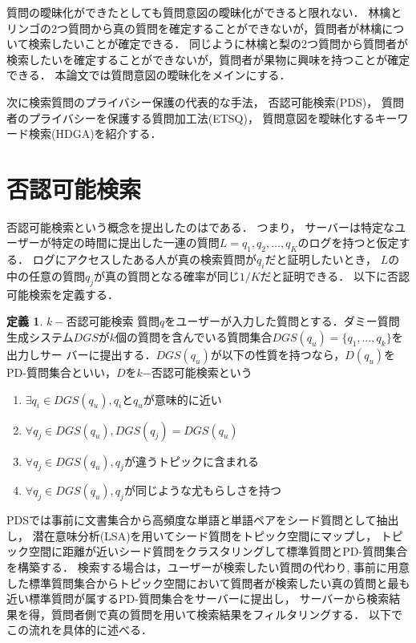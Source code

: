 \documentclass[master]{suribt}
\theoremstyle{definition}
\newtheorem{defi}[thm]{定義}
\begin{document}
 質問の曖昧化ができたとしても質問意図の曖昧化ができると限れない．
 {林檎}と{リンゴ}の2つ質問から真の質問を確定することができないが，質問者が林檎について検索したいことが確定できる．
 同じように{林檎}と{梨}の2つ質問から質問者が検索したいを確定することができないが，質問者が果物に興味を持つことが確定できる．
 本論文では質問意図の曖昧化をメインにする．

 次に検索質問のプライバシー保護の代表的な手法，
 否認可能検索(PDS)\cite{providing2009}，
 質問者のプライバシーを保護する質問加工法(ETSQ)\cite{embellishing2010}，
 質問意図を曖昧化するキーワード検索(HDGA)\cite{masking2014}を紹介する．
 
 \section{否認可能検索}\label{s:PDS}
 否認可能検索という概念を提出したのは\cite{}である．
 つまり， サーバーは特定なユーザーが特定の時間に提出した一連の質問$L = {q_1, q_2, \dots , q_K}$のログを持つと仮定する． 
 ログにアクセスしたある人が真の検索質問が$q_i$だと証明したいとき， $L$の中の任意の質問$q_j$が真の質問となる確率が同じ$1/K$だと証明できる．
 以下に否認可能検索を定義する．
 \begin{defi}{$k−$否認可能検索}
 	質問$q$をユーザーが入力した質問とする．ダミー質問生成システム$DGS$が$k$個の質問を含んでいる質問集合$DGS(q_u)=\{q_1, \dots , q_k\}$を出力しサー
	バーに提出する．$DGS(q_u)$が以下の性質を持つなら，$D(q_u)$をPD-質問集合といい，$D$を$k$−否認可能検索という
	\begin{enumerate}
	\item $\exists q_i \in DGS(q_u),q_i$と$q_u$が意味的に近い
	\item $\forall q_j \in DGS(q_u),DGS(q_j) = DGS(q_u)$
	\item $\forall q_j \in DGS(q_u),q_j$が違うトピックに含まれる
	\item $\forall q_j \in DGS(q_u),q_j$が同じような尤もらしさを持つ
	\end{enumerate}
  \end{defi}
 PDSでは事前に文書集合から高頻度な単語と単語ペアをシード質問として抽出し，
 潜在意味分析(LSA)\cite{LSA1990}を用いてシード質問をトピック空間にマップし，
 トピック空間に距離が近いシード質問をクラスタリングして標準質問とPD-質問集合を構築する．
 検索する場合は，ユーザーが検索したい質問の代わり,
 事前に用意した標準質問集合からトピック空間において質問者が検索したい真の質問と最も近い標準質問が属するPD-質問集合をサーバーに提出し，
 サーバーから検索結果を得，質問者側で真の質問を用いて検索結果をフィルタリングする．
 以下でこの流れを具体的に述べる．
\end{document}
